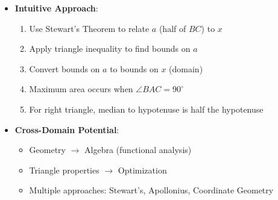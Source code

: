 \documentclass[12pt]{article}
\begin{document}
\begin{problemconfigbox}
\begin{itemize}[leftmargin=*]
    \item \textbf{Intuitive Approach}: 
    \begin{enumerate}
        \item Use Stewart's Theorem to relate $a$ (half of $BC$) to $x$
        \item Apply triangle inequality to find bounds on $a$
        \item Convert bounds on $a$ to bounds on $x$ (domain)
        \item Maximum area occurs when $\angle BAC = 90^{\circ}$
        \item For right triangle, median to hypotenuse is half the hypotenuse
    \end{enumerate}
    
    \item \textbf{Cross-Domain Potential}: 
    \begin{itemize}
        \item Geometry $\rightarrow$ Algebra (functional analysis)
        \item Triangle properties $\rightarrow$ Optimization
        \item Multiple approaches: Stewart's, Apollonius, Coordinate Geometry
    \end{itemize}
\end{itemize}
\end{problemconfigbox}
\end{document}
